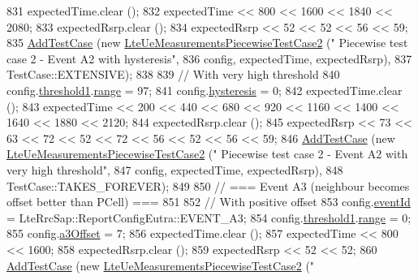 \begin{DoxyCode}
831   expectedTime.clear ();
832   expectedTime << 800 << 1600 << 1840 << 2080;
833   expectedRsrp.clear ();
834   expectedRsrp << 52 << 52 << 56 << 59;
835   \hyperlink{classns3_1_1TestCase_a3718088e3eefd5d6454569d2e0ddd835}{AddTestCase} (\textcolor{keyword}{new} \hyperlink{classLteUeMeasurementsPiecewiseTestCase2}{LteUeMeasurementsPiecewiseTestCase2} (\textcolor{stringliteral}{"
      Piecewise test case 2 - Event A2 with hysteresis"},
836                                                         config, expectedTime, expectedRsrp),
837                TestCase::EXTENSIVE);
838 
839   \textcolor{comment}{// With very high threshold}
840   config.\hyperlink{structns3_1_1LteRrcSap_1_1ReportConfigEutra_a8f36bc45a61054920e490be8bf33b4ca}{threshold1}.\hyperlink{structns3_1_1LteRrcSap_1_1ThresholdEutra_abd4950e20a1a93727535e8364bf85b03}{range} = 97;
841   config.\hyperlink{structns3_1_1LteRrcSap_1_1ReportConfigEutra_a1fb9169ea261ba20af6a0c18fcc04fa9}{hysteresis} = 0;
842   expectedTime.clear ();
843   expectedTime << 200 << 440 << 680 << 920 << 1160 << 1400 << 1640 << 1880 << 2120;
844   expectedRsrp.clear ();
845   expectedRsrp << 73 << 63 << 72 << 52 << 72 << 56 << 52 << 56 << 59;
846   \hyperlink{classns3_1_1TestCase_a3718088e3eefd5d6454569d2e0ddd835}{AddTestCase} (\textcolor{keyword}{new} \hyperlink{classLteUeMeasurementsPiecewiseTestCase2}{LteUeMeasurementsPiecewiseTestCase2} (\textcolor{stringliteral}{"
      Piecewise test case 2 - Event A2 with very high threshold"},
847                                                         config, expectedTime, expectedRsrp),
848                TestCase::TAKES\_FOREVER);
849 
850   \textcolor{comment}{// === Event A3 (neighbour becomes offset better than PCell) ===}
851 
852   \textcolor{comment}{// With positive offset}
853   config.\hyperlink{structns3_1_1LteRrcSap_1_1ReportConfigEutra_a1fbe931cc9584614d20f4affbce70d8a}{eventId} = LteRrcSap::ReportConfigEutra::EVENT\_A3;
854   config.\hyperlink{structns3_1_1LteRrcSap_1_1ReportConfigEutra_a8f36bc45a61054920e490be8bf33b4ca}{threshold1}.\hyperlink{structns3_1_1LteRrcSap_1_1ThresholdEutra_abd4950e20a1a93727535e8364bf85b03}{range} = 0;
855   config.\hyperlink{structns3_1_1LteRrcSap_1_1ReportConfigEutra_ae3226d3c9ec9988fefee04790ac6c9f6}{a3Offset} = 7;
856   expectedTime.clear ();
857   expectedTime << 800 << 1600;
858   expectedRsrp.clear ();
859   expectedRsrp << 52 << 52;
860   \hyperlink{classns3_1_1TestCase_a3718088e3eefd5d6454569d2e0ddd835}{AddTestCase} (\textcolor{keyword}{new} \hyperlink{classLteUeMeasurementsPiecewiseTestCase2}{LteUeMeasurementsPiecewiseTestCase2} (\textcolor{stringliteral}{"
}
\end{DoxyCode}
